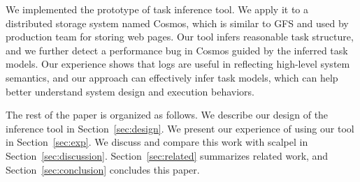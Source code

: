 We implemented the prototype of task inference tool.
We apply it to a distributed storage system
named Cosmos, which is similar to GFS and used by production
team for storing web pages. Our tool infers reasonable
task structure, and we further detect a performance
bug in Cosmos guided by the inferred task models.
Our experience shows that logs are useful in reflecting
high-level system semantics, and our approach can effectively
infer task models, which can help better understand system
design and execution behaviors.

The rest of the paper is organized as follows. We describe
our design of the inference tool in
Section~\ref{sec:design}.  We present our experience of
using our tool in Section~\ref{sec:exp}.  We discuss and
compare this work with scalpel in
Section~\ref{sec:discussion}.
Section~\ref{sec:related} summarizes related work, and
Section~\ref{sec:conclusion} concludes this paper.











